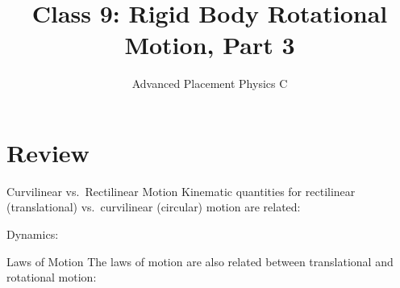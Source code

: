 \documentclass[12pt,compress,aspectratio=169]{beamer}
\title{Class 9: Rigid Body Rotational Motion, Part 3}
\subtitle{Advanced Placement Physics C}
\begin{document}
\begin{frame}
  \maketitle
\end{frame}



\section{Review}

\begin{frame}{Curvilinear vs.\ Rectilinear Motion}
  Kinematic quantities for rectilinear (translational) vs.\ curvilinear
  (circular) motion are related:

  \vspace{-.25in}{\large
    \begin{align*}
      \vec r &\quad\rightarrow\quad \theta \\
      \vec v &\quad\rightarrow\quad \omega \\
      \vec a &\quad\rightarrow\quad \alpha
    \end{align*}
  }

  Dynamics:
  
\end{frame}



\begin{frame}{Laws of Motion}
  The laws of motion are also related between translational and rotational
  motion:
  
\end{frame}
\end{document}
